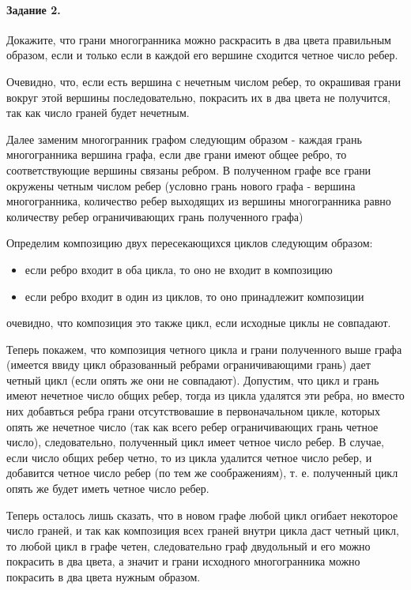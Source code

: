 \documentclass[a4paper,12pt]{article}
\begin{document}
\paragraph{Задание 2.} Докажите, что грани многогранника можно раскрасить в два цвета правильным образом, если и только если в каждой его вершине сходится четное число ребер.

\begin{Solution}
Очевидно, что, если есть вершина с нечетным числом ребер, то окрашивая грани вокруг этой вершины последовательно, покрасить их в два цвета не получится, так как число граней будет нечетным.

Далее заменим многогранник графом следующим образом - каждая грань многогранника вершина графа, если две грани имеют общее ребро, то соответствующие вершины связаны ребром. В полученном графе все грани окружены четным числом ребер (условно грань нового графа - вершина многогранника, количество ребер выходящих из вершины многогранника равно количеству ребер ограничивающих грань полученного графа)

Определим композицию двух пересекающихся циклов следующим образом:
\begin{itemize}
\item если ребро входит в оба цикла, то оно не входит в композицию

\item если ребро входит в один из циклов, то оно принадлежит композиции
\end{itemize}

очевидно, что композиция это также цикл, если исходные циклы не совпадают.

Теперь покажем, что композиция четного цикла и грани полученного выше графа (имеется ввиду цикл образованный ребрами ограничивающими грань) дает четный цикл (если опять же они не совпадают). Допустим, что цикл и грань имеют нечетное число общих ребер, тогда из цикла удалятся эти ребра, но вместо них добавться ребра грани отсутствовашие в первоначальном цикле, которых опять же нечетное число (так как всего ребер ограничивающих грань четное число), следовательно, полученный цикл имеет четное число ребер. В случае, если число общих ребер четно, то из цикла удалится четное число ребер, и добавится четное число ребер (по тем же соображениям), т. е. полученный цикл опять же будет иметь четное число ребер.

Теперь осталось лишь сказать, что в новом графе любой цикл огибает некоторое число граней, и так как композиция всех граней внутри цикла даст четный цикл, то любой цикл в графе четен, следовательно граф двудольный и его можно покрасить в два цвета, а значит и грани исходного многогранника можно покрасить в два цвета нужным образом.
\end{Solution}
\end{document}
